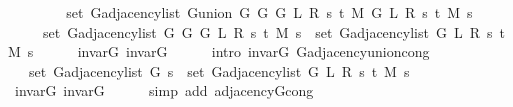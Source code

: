\begin{isabellebody}
%
\isadelimproof
%
\endisadelimproof
%
\isatagproof
{}\isamarkupfalse%
\ {\isacharminus}{\kern0pt}\isanewline
\ \ \isamarkupfalse%
\isanewline
\ \ \ \ {\isachardoublequoteopen}set\ {\isacharparenleft}{\kern0pt}G{\isachardot}{\kern0pt}adjacency{\isacharunderscore}{\kern0pt}list\ {\isacharparenleft}{\kern0pt}G{\isachardot}{\kern0pt}union\ {\isacharparenleft}{\kern0pt}G{}\ G\ {\isacharparenleft}{\kern0pt}G{}\ L\ R\ s\ t\ M{\isacharparenright}{\kern0pt}{\isacharparenright}{\kern0pt}\ {\isacharparenleft}{\kern0pt}G{}\ L\ R\ s\ t\ M{\isacharparenright}{\kern0pt}{\isacharparenright}{\kern0pt}\ s{\isacharparenright}{\kern0pt}\ {\isacharequal}{\kern0pt}\isanewline
\ \ \ \ \ set\ {\isacharparenleft}{\kern0pt}G{\isachardot}{\kern0pt}adjacency{\isacharunderscore}{\kern0pt}list\ {\isacharparenleft}{\kern0pt}G{}\ G\ {\isacharparenleft}{\kern0pt}G{}\ L\ R\ s\ t\ M{\isacharparenright}{\kern0pt}{\isacharparenright}{\kern0pt}\ s{\isacharparenright}{\kern0pt}\ {\isasymunion}\ set\ {\isacharparenleft}{\kern0pt}G{\isachardot}{\kern0pt}adjacency{\isacharunderscore}{\kern0pt}list\ {\isacharparenleft}{\kern0pt}G{}\ L\ R\ s\ t\ M{\isacharparenright}{\kern0pt}\ s{\isacharparenright}{\kern0pt}{\isachardoublequoteclose}\isanewline
\ \ \ \ \isamarkupfalse%
\ invar{\isacharunderscore}{\kern0pt}G\ invar{\isacharunderscore}{\kern0pt}G{}\isanewline
\ \ \ \ \isamarkupfalse%
\ {\isacharparenleft}{\kern0pt}intro\ invar{\isacharunderscore}{\kern0pt}G{}\ G{\isachardot}{\kern0pt}adjacency{\isacharunderscore}{\kern0pt}union{\isacharunderscore}{\kern0pt}cong{\isacharparenright}{\kern0pt}\isanewline
\ \ \isamarkupfalse%
\ \isamarkupfalse%
\ {\isachardoublequoteopen}{\isachardot}{\kern0pt}{\isachardot}{\kern0pt}{\isachardot}{\kern0pt}\ {\isacharequal}{\kern0pt}\ set\ {\isacharparenleft}{\kern0pt}G{\isachardot}{\kern0pt}adjacency{\isacharunderscore}{\kern0pt}list\ G\ s{\isacharparenright}{\kern0pt}\ {\isasymunion}\ set\ {\isacharparenleft}{\kern0pt}G{\isachardot}{\kern0pt}adjacency{\isacharunderscore}{\kern0pt}list\ {\isacharparenleft}{\kern0pt}G{}\ L\ R\ s\ t\ M{\isacharparenright}{\kern0pt}\ s{\isacharparenright}{\kern0pt}{\isachardoublequoteclose}\isanewline
\ \ \ \ \isamarkupfalse%
\ invar{\isacharunderscore}{\kern0pt}G\ invar{\isacharunderscore}{\kern0pt}G{}\isanewline
\ \ \ \ \isamarkupfalse%
\ {\isacharparenleft}{\kern0pt}simp\ add{\isacharcolon}{\kern0pt}\ adjacency{\isacharunderscore}{\kern0pt}G{}{\isacharunderscore}{\kern0pt}cong{\isacharparenright}{\kern0pt}\isanewline

\end{isabellebody}
